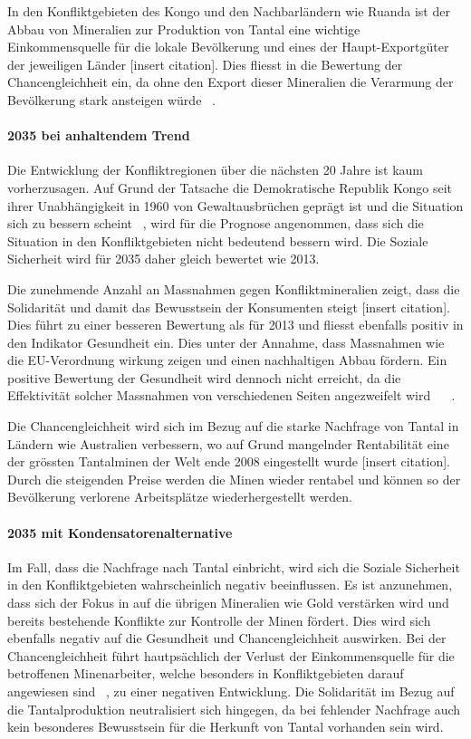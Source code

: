 In den Konfliktgebieten des Kongo und den Nachbarländern wie Ruanda ist der Abbau von 
Mineralien zur Produktion von Tantal eine wichtige Einkommensquelle für die lokale Bevölkerung
und eines der Haupt-Exportgüter der jeweiligen Länder [insert citation]. Dies fliesst in
die Bewertung der Chancengleichheit ein, da ohne den Export dieser Mineralien die Verarmung
der Bevölkerung stark ansteigen würde ~\cite{DRCongo35}.

\paragraph{2035 bei anhaltendem Trend} Die Entwicklung der Konfliktregionen über die nächsten 20 Jahre
ist kaum vorherzusagen. Auf Grund der Tatsache die Demokratische Republik Kongo seit ihrer Unabhängigkeit
in 1960 von Gewaltausbrüchen geprägt ist und die Situation sich zu bessern scheint ~\cite{Demokrat2}, wird für die 
Prognose angenommen, dass sich die Situation in den Konfliktgebieten nicht bedeutend bessern wird.
Die Soziale Sicherheit wird für 2035 daher gleich bewertet wie 2013. 

Die zunehmende Anzahl an Massnahmen gegen Konfliktmineralien zeigt, dass die Solidarität und damit das Bewusstsein
der Konsumenten steigt [insert citation]. Dies führt zu einer besseren Bewertung als für 2013 und fliesst ebenfalls
positiv in den Indikator Gesundheit ein. Dies unter der Annahme, dass Massnahmen wie die EU-Verordnung wirkung zeigen und
einen nachhaltigen Abbau fördern. Ein positive Bewertung der Gesundheit wird dennoch nicht erreicht, da die Effektivität
solcher Massnahmen von verschiedenen Seiten angezweifelt wird ~\cite{Demokrat2} ~\cite{TheEUCon25}. 

Die Chancengleichheit wird sich im Bezug auf die starke Nachfrage von Tantal in Ländern wie
Australien verbessern, wo auf Grund mangelnder Rentabilität eine der grössten Tantalminen der Welt ende 2008 
eingestellt wurde [insert citation]. Durch die steigenden Preise werden die Minen wieder rentabel und 
können so der Bevölkerung verlorene Arbeitsplätze wiederhergestellt werden.  

\paragraph{2035 mit Kondensatorenalternative} Im Fall, dass die Nachfrage nach Tantal einbricht, wird sich die
Soziale Sicherheit in den Konfliktgebieten wahrscheinlich negativ beeinflussen. Es ist anzunehmen, dass sich der
Fokus in auf die übrigen Mineralien wie Gold verstärken wird und bereits bestehende Konflikte zur Kontrolle der 
Minen fördert. Dies wird sich ebenfalls negativ auf die Gesundheit und Chancengleichheit auswirken. Bei der 
Chancengleichheit führt hautpsächlich der Verlust der Einkommensquelle für die betroffenen Minenarbeiter, welche
besonders in Konfliktgebieten darauf angewiesen sind ~\cite{Obamasc19}, zu einer negativen Entwicklung. 
Die Solidarität im Bezug auf die Tantalproduktion neutralisiert sich hingegen, da bei fehlender Nachfrage auch 
kein besonderes Bewusstsein für die Herkunft von Tantal vorhanden sein wird.  

